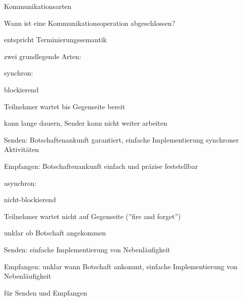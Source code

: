 \documentclass[10pt]{article}
\begin{document}
Kommunikationsarten
\begin{itemize*}
  \item Wann ist eine Kommunikationsoperation abgeschlossen?
  \item entspricht Terminierungssemantik
  \item zwei grundlegende Arten:
  \begin{itemize*}
    \item synchron:
    \begin{itemize*}
      \item blockierend
      \item Teilnehmer wartet bis Gegenseite bereit
      \item kann lange dauern, Sender kann nicht weiter arbeiten
      \item Senden: Botschaftenankunft garantiert, einfache Implementierung synchroner Aktivitäten
      \item Empfangen: Botschaftenankunft einfach und präzise feststellbar
    \end{itemize*}
    \item asynchron:
    \begin{itemize*}
      \item nicht-blockierend
      \item Teilnehmer wartet nicht auf Gegenseite (”fire and forget”)
      \item unklar ob Botschaft angekommen
      \item Senden: einfache Implementierung von Nebenläufigkeit
      \item Empfangen: unklar wann Botschaft ankommt, einfache Implementierung von Nebenläufigkeit
    \end{itemize*}
    \item für Senden und Empfangen
  \end{itemize*}
\end{itemize*}
\end{document}
